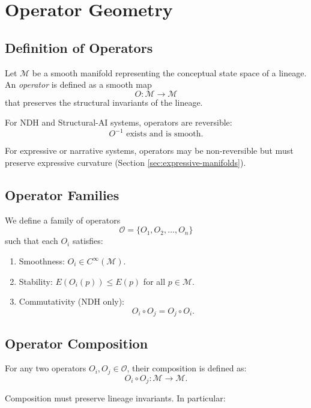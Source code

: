 
\section{Operator Geometry}
\label{sec:operator-geometry}

\subsection{Definition of Operators}

Let $\mathcal{M}$ be a smooth manifold representing the conceptual state space
of a lineage. An \emph{operator} is defined as a smooth map
\[
O : \mathcal{M} \rightarrow \mathcal{M}
\]
that preserves the structural invariants of the lineage.

For NDH and Structural-AI systems, operators are reversible:
\[
O^{-1} \text{ exists and is smooth}.
\]

For expressive or narrative systems, operators may be non-reversible but must
preserve expressive curvature (Section \ref{sec:expressive-manifolds}).

\subsection{Operator Families}

We define a family of operators
\[
\mathcal{O} = \{ O_1, O_2, \ldots, O_n \}
\]
such that each $O_i$ satisfies:

\begin{enumerate}
    \item Smoothness: $O_i \in C^\infty(\mathcal{M})$.
    \item Stability: $E(O_i(p)) \leq E(p)$ for all $p \in \mathcal{M}$.
    \item Commutativity (NDH only):
    \[
    O_i \circ O_j = O_j \circ O_i.
    \]
\end{enumerate}

\subsection{Operator Composition}

For any two operators $O_i, O_j \in \mathcal{O}$, their composition is defined as:
\[
O_i \circ O_j : \mathcal{M} \rightarrow \mathcal{M}.
\]

Composition must preserve lineage invariants. In particular:

